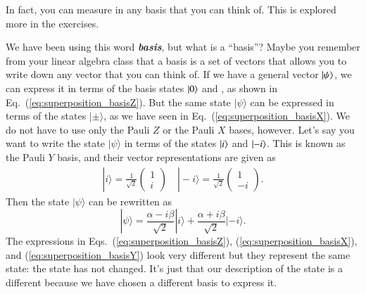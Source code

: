 In fact, you can measure in any basis that you can think of.  This is explored more in the exercises.

We have been using this word \textbf{\emph{basis}}, but what is a ``basis''? Maybe you remember from your linear algebra class that a basis is a set of vectors that allows you to write down any vector that you can think of. If we have a general vector $\left| \psi \right\rangle$, we can express it in terms of the basis states $\left| 0 \right\rangle$ and , as shown in Eq.~(\ref{eq:superposition_basisZ}).
But the same state $|\psi\rangle$ can be expressed in terms of the states $|\pm\rangle$, as we have seen in Eq.~(\ref{eq:superposition_basisX}).
We do not have to use only the Pauli $Z$ or the Pauli $X$ bases, however.
Let's say you want to write the state $|\psi\rangle$ in terms of the states $\left| i \right\rangle$ and $\left| -i \right\rangle$.
This is known as the Pauli $Y$ basis, and their vector representations are given as
\begin{align}
    |i\rangle=\frac{1}{\sqrt{2}}\left(\begin{array}{l}1 \\ i\end{array}\right) \quad|-i\rangle=\frac{1}{\sqrt{2}}\left(\begin{array}{c}1 \\ -i\end{array}\right).
    \label{eq:Pauli_Y_basis}
\end{align}
Then the state $|\psi\rangle$ can be rewritten as
\begin{equation}
    |\psi\rangle=\frac{\alpha-i \beta}{\sqrt{2}}|i\rangle+\frac{\alpha+i \beta}{\sqrt{2}}|-i\rangle.
    \label{eq:superposition_basisY}
\end{equation}
The expressions in Eqs.~(\ref{eq:superposition_basisZ}), (\ref{eq:superposition_basisX}), and (\ref{eq:superposition_basisY}) look very different but they represent the same state: the state has not changed.
It's just that our description of the state is a different because we have chosen a different basis to express it.

